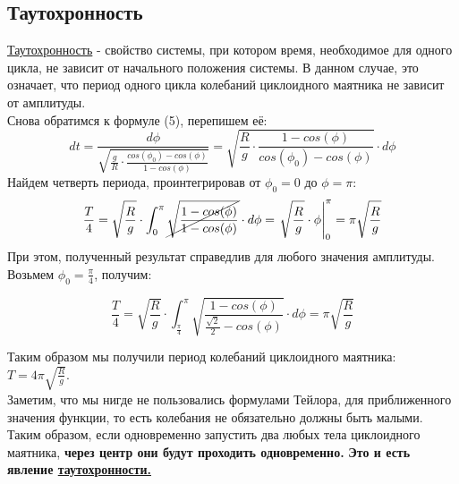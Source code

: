 \documentclass[a4paper, 10pt, twocolumn]{article}
\begin{document}
    \subsection*{Таутохронность}
    \underline{Таутохронность} - свойство системы, при котором время, необходимое для одного цикла, не зависит от начального
    положения системы. В данном случае, это означает, что период одного цикла колебаний циклоидного
    маятника не зависит от амплитуды. \\
    Снова обратимся к формуле (5), перепишем её:
    $$ dt = \frac{d\phi}{\sqrt{\frac{g}{R}\cdot\frac{cos(\phi_0) - cos(\phi)}{1 - cos(\phi)}}} = 
    \sqrt{\frac{R}{g}\cdot\frac{1 - cos(\phi)}{cos(\phi_0) - cos(\phi)}} \cdot d\phi $$
    Найдем четверть периода, проинтегрировав от $\phi_0 = 0$ до $\phi = \pi$:
    $$ \frac{T}{4} = \sqrt{\frac{R}{g}}\cdot\int_{0}^{\pi}\cancel{\sqrt{\frac{1 - cos(\phi)}{1 - cos(\phi)}}}\cdot d\phi
     = \left.\sqrt{\frac{R}{g}}\cdot\phi\right|^{\pi}_{0} = \pi\sqrt{\frac{R}{g}}$$
    При этом, полученный результат справедлив для любого значения амплитуды. \\
    Возьмем $\phi_0 = \frac{\pi}{4}$, получим:

    $$ \frac{T}{4} = \sqrt{\frac{R}{g}}\cdot\int_{\frac{\pi}{4}}^{\pi}\sqrt{\frac{1 - cos(\phi)}{\frac{\sqrt{2}}{2} - cos(\phi)}}\cdot d\phi = \pi\sqrt{\frac{R}{g}} $$

    Таким образом мы 
    получили период колебаний циклоидного маятника: $T = 4\pi\sqrt{\frac{R}{g}}$. \\
    Заметим, что мы нигде не пользовались формулами Тейлора, для приближенного значения функции, то 
    есть колебания не обязательно должны быть малыми. Таким образом, если одновременно 
    запустить два любых тела циклоидного маятника, \textbf{через центр они будут проходить 
    одновременно.} \textbf{Это и есть явление \underline{таутохронности.}}
\end{document}
